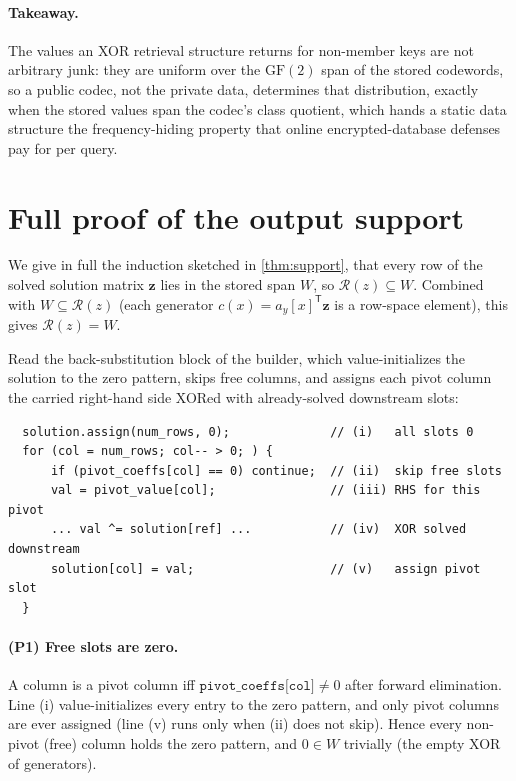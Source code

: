 \documentclass[acmsmall,review]{acmart}
\newcommand{\GF}{\mathrm{GF}(2)}
\newcommand{\W}{W}                          %
\newcommand{\Rz}{\mathcal{R}(z)}            %
\newcommand{\bz}{\mathbf{z}}                %
\newcommand{\ay}{a_y}                       %
\newcommand{\cx}{c(x)}                      %
\begin{document}
\paragraph{Takeaway.}
The values an XOR retrieval structure returns for non-member keys are not arbitrary junk: they are
uniform over the $\GF$ span of the stored codewords, so a public codec, not the private data,
determines that distribution, exactly when the stored values span the codec's class quotient,
which hands a static data structure the frequency-hiding property that online encrypted-database
defenses pay for per query.

\appendix

\section{Full proof of the output support}
\label{app:proofs}

We give in full the induction sketched in \cref{thm:support}, that every row of the solved
solution matrix $\bz$ lies in the stored span $\W$, so $\Rz \subseteq \W$. Combined with
$\W \subseteq \Rz$ (each generator $\cx = \ay[x]^{\mathsf T}\bz$ is a row-space element), this
gives $\Rz = \W$.

Read the back-substitution block of the builder, which value-initializes the solution to the zero
pattern, skips free columns, and assigns each pivot column the carried right-hand side XORed with
already-solved downstream slots:
\begin{verbatim}
  solution.assign(num_rows, 0);              // (i)   all slots 0
  for (col = num_rows; col-- > 0; ) {
      if (pivot_coeffs[col] == 0) continue;  // (ii)  skip free slots
      val = pivot_value[col];                // (iii) RHS for this pivot
      ... val ^= solution[ref] ...           // (iv)  XOR solved downstream
      solution[col] = val;                   // (v)   assign pivot slot
  }
\end{verbatim}

\paragraph{(P1) Free slots are zero.}
A column is a pivot column iff $\texttt{pivot\_coeffs[col]} \ne 0$ after forward elimination. Line
(i) value-initializes every entry to the zero pattern, and only pivot columns are ever assigned
(line (v) runs only when (ii) does not skip). Hence every non-pivot (free) column holds the zero
pattern, and $0 \in \W$ trivially (the empty XOR of generators).
\end{document}
